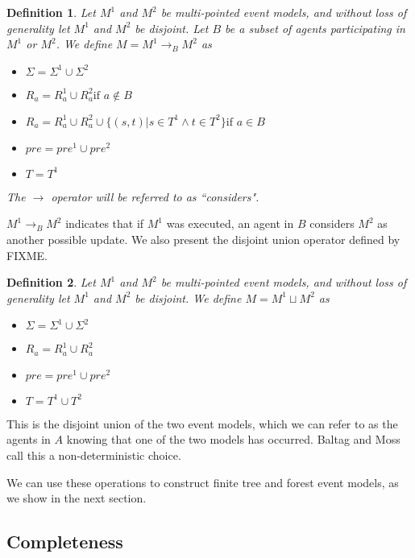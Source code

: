 \documentclass[12pt, a4paper, titlepage]{scrartcl}
\newtheorem{defn}{Definition}[section]
\numberwithin{equation}{section}
\begin{document}
\begin{defn} \label{considers}
Let $M^1$ and $M^2$ be multi-pointed event models, and without loss of
generality let $M^1$ and $M^2$ be disjoint.
Let $B$ be a subset of agents participating in $M^1$ or $M^2$.
We define $M = M^1 \to_B M^2$ as 
\begin{itemize}
  \item $\Sigma = \Sigma^1 \cup \Sigma^2$
  \item $R_a = R^1_a \cup R^2_a \text{if } a \notin B$
	\item $R_a =
      R^1_a \cup
      R^2_a \cup
      \{(s,t) | s \in T^1 \land t \in T^2 \}
    \text{if } a \in B $
  \item $pre = pre^1 \cup pre^2$
  \item $T = T^1$
\end{itemize}
The $\to$ operator will be referred to as ``considers".
\end{defn}

$M^1 \to_B M^2$ indicates that if $M^1$ was executed, an agent in $B$ considers $M^2$ as another
possible update.
We also present the disjoint union operator defined by FIXME.


\begin{defn} \label{disjoint}
Let $M^1$ and $M^2$ be multi-pointed event models, and without loss of generality let $M^1$ and
$M^2$ be disjoint.
We define $M = M^1 \sqcup M^2$ as
\begin{itemize}
	\item $\Sigma = \Sigma^1 \cup \Sigma^2$
	\item $R_a = R^1_a \cup R^2_a$
	\item $pre = pre^1 \cup pre^2$
	\item $T = T^1 \cup T^2$
\end{itemize}
\end{defn}
This is the disjoint union of the two event models, which we can refer to as the agents in $A$
knowing that one of the two models has occurred.
Baltag and Moss call this a non-deterministic choice.

We can use these operations to construct finite tree and forest event models, as we show
in the next section.

\subsection{Completeness}
\end{document}
